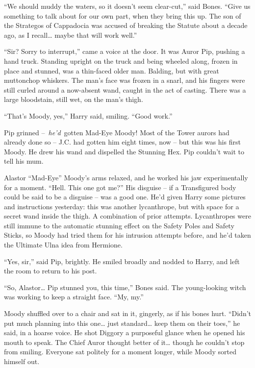 ``We should muddy the waters, so it doesn't seem clear-cut,'' said
Bones. ``Give us something to talk about for our own part, when they
bring this up. The son of the Strategos of Cappadocia was accused of
breaking the Statute about a decade ago, as I recall\ldots{} maybe that
will work well.''

``Sir? Sorry to interrupt,'' came a voice at the door. It was Auror Pip,
pushing a hand truck. Standing upright on the truck and being wheeled
along, frozen in place and stunned, was a thin-faced older man. Balding,
but with great muttonchop whiskers. The man's face was frozen in a
snarl, and his fingers were still curled around a now-absent wand,
caught in the act of casting. There was a large bloodstain, still wet,
on the man's thigh.

``That's Moody, yes,'' Harry said, smiling. ``Good work.''

Pip grinned --~\emph{he'd}~gotten Mad-Eye Moody! Most of the Tower
aurors had already done so -- J.C. had gotten him eight times, now --
but this was his first Moody. He drew his wand and dispelled the
Stunning Hex. Pip couldn't wait to tell his mum.

Alastor ``Mad-Eye'' Moody's arms relaxed, and he worked his jaw
experimentally for a moment. ``Hell. This one got me?'' His disguise --
if a Transfigured body could be said to be a disguise -- was a good one.
He'd given Harry some pictures and instructions yesterday: this was
another lycanthrope, but with space for a secret wand inside the thigh.
A combination of prior attempts. Lycanthropes were still immune to the
automatic stunning effect on the Safety Poles and Safety Sticks, so
Moody had tried them for his intrusion attempts before, and he'd taken
the Ultimate Ulna idea from Hermione.

``Yes, sir,'' said Pip, brightly. He smiled broadly and nodded to Harry,
and left the room to return to his post.

``So, Alastor\ldots{} Pip stunned you, this time,'' Bones said. The
young-looking witch was working to keep a straight face. ``My, my.''

Moody shuffled over to a chair and sat in it, gingerly, as if his bones
hurt. ``Didn't put much planning into this one\ldots{} just
standard\ldots{} keep them on their toes,'' he said, in a hoarse voice.
He shot Diggory a purposeful glance when he opened his mouth to speak.
The Chief Auror thought better of it\ldots{} though he couldn't stop
from smiling. Everyone sat politely for a moment longer, while Moody
sorted himself out.

